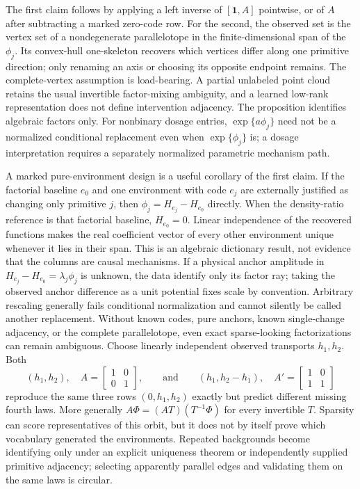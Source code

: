 \documentclass[11pt]{article}
\begin{document}
The first claim follows by applying a left inverse of \([\mathbf 1,A]\)
pointwise, or of \(A\) after subtracting a marked zero-code row.  For the
second, the observed set is the vertex set of a nondegenerate parallelotope in
the finite-dimensional span of the \(\phi_j\).  Its convex-hull one-skeleton
recovers which vertices differ along one primitive direction; only renaming an
axis or choosing its opposite endpoint remains.  The complete-vertex
assumption is load-bearing.  A partial unlabeled point cloud retains the usual
invertible factor-mixing ambiguity, and a learned low-rank representation does
not define intervention adjacency.  The proposition identifies algebraic
factors only.  For nonbinary dosage entries, \(\exp\{a\phi_j\}\) need not be a
normalized conditional replacement even when \(\exp\{\phi_j\}\) is; a dosage
interpretation requires a separately normalized parametric mechanism path.

A marked pure-environment design is a useful corollary of the first claim.  If
the factorial baseline \(e_0\) and one environment with code \(e_j\) are
externally justified as changing only primitive \(j\), then
\(\phi_j=H_{e_j}-H_{e_0}\) directly.  When the density-ratio reference is that
factorial baseline, \(H_{e_0}=0\).  Linear independence of the recovered
functions makes the real coefficient vector of every other environment unique
whenever it lies in their span.  This is an algebraic dictionary result, not
evidence that the columns are causal mechanisms.  If a physical anchor
amplitude in \(H_{e_j}-H_{e_0}=\lambda_j\phi_j\) is unknown, the data identify
only its factor ray; taking the observed anchor difference as a unit potential
fixes scale by convention.  Arbitrary rescaling generally fails conditional
normalization and cannot silently be called another replacement.
Without known codes, pure anchors, known single-change adjacency, or the
complete parallelotope, even exact sparse-looking factorizations can remain
ambiguous.  Choose linearly independent observed transports \(h_1,h_2\).  Both
\begin{equation}
  (h_1,h_2),\quad A=\begin{bmatrix}1&0\\0&1\end{bmatrix},
  \qquad\text{and}\qquad
  (h_1,h_2-h_1),\quad A'=\begin{bmatrix}1&0\\1&1\end{bmatrix}
\end{equation}
reproduce the same three rows \((0,h_1,h_2)\) exactly but predict different
missing fourth laws.  More generally \(A\Phi=(AT)(T^{-1}\Phi)\)
for every invertible \(T\).  Sparsity can score representatives of this orbit,
but it does not by itself prove which vocabulary generated the environments.
Repeated backgrounds become identifying only under an explicit uniqueness
theorem or independently supplied primitive adjacency; selecting apparently
parallel edges and validating them on the same laws is circular.
\end{document}
